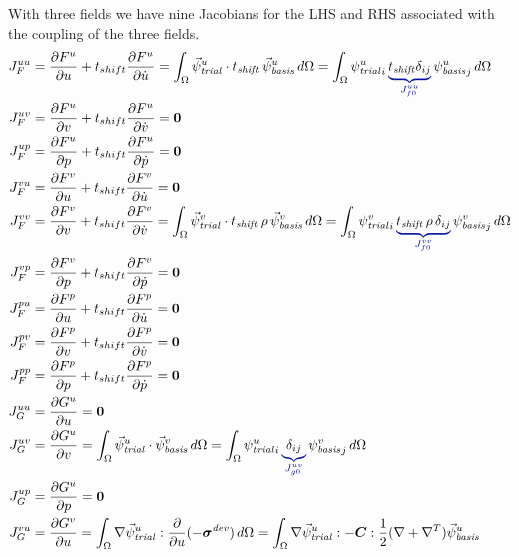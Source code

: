 With three fields we have nine Jacobians for the LHS and RHS associated with the coupling of 
the three fields.
\begin{align}
  J_F^{uu} &= \frac{\partial F^u}{\partial u} + t_{shift} \frac{\partial F^u}{\partial 
\dot{u}} = \int_\Omega 
\trialvec[u] \cdot t_\mathit{shift}\,\basisvec[u] \, d\Omega = \int_\Omega \trialscalar[u]_i 
\, 
\eqnannotate{t_\mathit{shift} \delta_{ij}}{J_{f0}^{uu}} \, \basisscalar[u]_j \, d\Omega \\
  J_F^{uv} &= \frac{\partial F^u}{\partial v} + t_{shift} \frac{\partial F^u}{\partial 
\dot{v}} = \tensor{0} \\
  J_F^{up} &= \frac{\partial F^u}{\partial p} + t_{shift} \frac{\partial F^u}{\partial 
\dot{p}} = \tensor{0} \\
%
  J_F^{vu} &= \frac{\partial F^v}{\partial u} + t_{shift} \frac{\partial F^v}{\partial 
\dot{u}} = \tensor{0} \\
  J_F^{vv} &= \frac{\partial F^v}{\partial v} + t_{shift} \frac{\partial F^v}{\partial 
\dot{v}} = \int_\Omega 
\trialvec[v] \cdot t_\mathit{shift}\,\rho\,\basisvec[v] \, d\Omega = \int_\Omega 
\trialscalar[v]_i \, 
\eqnannotate{t_\mathit{shift} \, \rho \, \delta_{ij}}{J_{f0}^{vv}} \, \basisscalar[v]_j \, 
d\Omega \\
  J_F^{vp} &= \frac{\partial F^v}{\partial p} + t_{shift} \frac{\partial F^v}{\partial 
\dot{p}} = \tensor{0} \\
%
  J_F^{pu} &= \frac{\partial F^p}{\partial u} + t_{shift} \frac{\partial F^p}{\partial 
\dot{u}} = \tensor{0} \\
  J_F^{pv} &= \frac{\partial F^p}{\partial v} + t_{shift} \frac{\partial F^p}{\partial 
\dot{v}} = \tensor{0} \\
  J_F^{pp} &= \frac{\partial F^p}{\partial p} + t_{shift} \frac{\partial F^p}{\partial 
\dot{p}} = \tensor{0} \\
%
  J_G^{uu} &= \frac{\partial G^u}{\partial u} = \tensor{0} \\
  J_G^{uv} &= \frac{\partial G^u}{\partial v} = \int_\Omega \trialvec[u] \cdot \basisvec[v] \, 
d\Omega = 
\int_\Omega \trialscalar[u]_i \, \eqnannotate{\delta_{ij}}{J_{g0}^{uv}} \, \basisscalar[v]_j 
\, d\Omega \\
  J_G^{up} &= \frac{\partial G^u}{\partial p} = \tensor{0} \\
%
  J_G^{vu} &= \frac{\partial G^v}{\partial u} = \int_\Omega \nabla \trialvec[u] : 
\frac{\partial}{\partial u}(-
\tensor{\sigma}^\mathit{dev}) \, d\Omega 
  = \int_\Omega \nabla \trialvec[u] : -\tensor{C} : \frac{1}{2}(\nabla + \nabla^T)\basisvec[u] 

\end{align}

